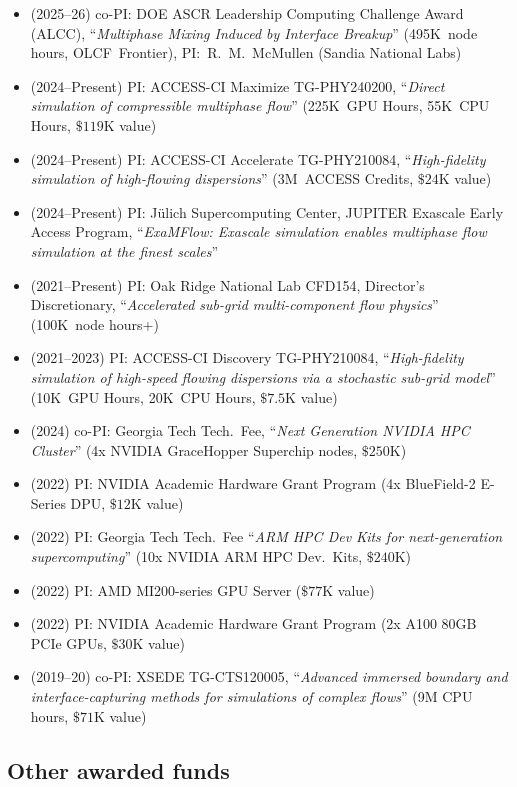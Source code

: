 \begin{itemize}
    \item (2025--26) co-PI: DOE ASCR Leadership Computing Challenge Award (ALCC), ``\textit{Multiphase Mixing Induced by Interface Breakup}'' (495K~node hours, OLCF~Frontier), PI:~R.~M.~McMullen (Sandia National Labs)
    \item (2024--Present) PI: ACCESS-CI Maximize TG-PHY240200, ``\textit{Direct simulation of compressible multiphase flow}'' (225K~GPU Hours, 55K~CPU Hours, $\$119$K value)
    \item (2024--Present) PI: ACCESS-CI Accelerate TG-PHY210084, ``\textit{High-fidelity simulation of high-flowing dispersions}'' (3M~ACCESS Credits, $\$24$K value)
    \item (2024--Present) PI: J\"ulich Supercomputing Center, JUPITER Exascale Early Access Program, ``\textit{ExaMFlow: Exascale simulation enables multiphase flow simulation at the finest scales}''
    \item (2021--Present) PI: Oak Ridge National Lab CFD154, Director's Discretionary, ``\textit{Accelerated sub-grid multi-component flow physics}'' (100K~node hours+)
    \item (2021--2023) PI: ACCESS-CI Discovery TG-PHY210084, ``\textit{High-fidelity simulation of high-speed flowing dispersions via a stochastic sub-grid model}'' (10K~GPU Hours, 20K~CPU Hours, $\$7.5$K value)
    \item (2024) co-PI: Georgia Tech Tech.\ Fee, ``\textit{Next Generation NVIDIA HPC Cluster}'' (4x NVIDIA GraceHopper Superchip nodes, $\$250$K)
    \item (2022) PI: NVIDIA Academic Hardware Grant Program (4x BlueField-2 E-Series DPU, $\$12$K value)
    \item (2022) PI: Georgia Tech Tech.\ Fee ``\textit{ARM HPC Dev Kits for next-generation supercomputing}'' (10x NVIDIA ARM HPC Dev.\ Kits, $\$240$K)
    \item (2022) PI: AMD MI200-series GPU Server ($\$77$K value)
    \item (2022) PI: NVIDIA Academic Hardware Grant Program (2x A100 80GB PCIe GPUs, $\$30$K value)
    \item (2019--20) co-PI: XSEDE TG-CTS120005, ``\textit{Advanced immersed boundary and interface-capturing methods for simulations of complex flows}'' (9M CPU hours, $\$71$K value)
\end{itemize}

\subsection{Other awarded funds}

